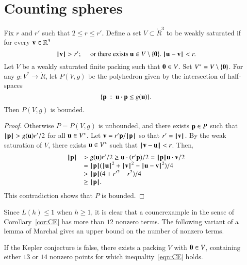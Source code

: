 \section{Counting spheres}

\begin{lemma}\label{lemma:poly-bounded} 
Fix $r$ and $r'$ such that $2\le r\le r'$.
Define a set $ V\subset\ring{R}^3$ to be weakly saturated if for every ${\mathbf v}\in\mathbb{R}^3$
$$
{{\hskip0.1em|\hskip-0.15em|\hskip0.1em}{\mathbf v}{\hskip0.1em|\hskip-0.15em|\hskip0.1em}}> r'; \quad\text{ or there exists }  {\mathbf u}\in V\setminus\{{\mathbf 0}\}.~{\hskip0.1em|\hskip-0.15em|\hskip0.1em} {\mathbf u} - {\mathbf v}{\hskip0.1em|\hskip-0.15em|\hskip0.1em}< r.
$$
Let $ V$ be a weakly saturated finite packing such that ${\mathbf 0}\in  V$.
Set $ V^*= V\setminus\{{\mathbf 0}\}$.
%
For any $g: V^*\to\ring{R}$, let $P( V,g)$ be the
polyhedron given by the intersection of half-spaces
$$
\{{\mathbf p} \ :\   {\mathbf u}\cdot {\mathbf p} \le g( {\mathbf u})\}.
$$
Then $P( V,g)$ is bounded.
\end{lemma}
%

\begin{proof}  Otherwise $P=P( V,g)$ is unbounded, and there exists ${\mathbf p}\in P$ such that
${{\hskip0.1em|\hskip-0.15em|\hskip0.1em}{\mathbf p}{\hskip0.1em|\hskip-0.15em|\hskip0.1em}} > g( {\mathbf u}) r'/2$ for all $ {\mathbf u}\in V^*$.  Let ${\mathbf v} =  r' {\mathbf p}/{{\hskip0.1em|\hskip-0.15em|\hskip0.1em}{\mathbf p}{\hskip0.1em|\hskip-0.15em|\hskip0.1em}}$ so that $r'={{\hskip0.1em|\hskip-0.15em|\hskip0.1em}{\mathbf v}{\hskip0.1em|\hskip-0.15em|\hskip0.1em}}$.  By the weak saturation of $ V$, there exists $ {\mathbf u}\in V^*$ such that ${\hskip0.1em|\hskip-0.15em|\hskip0.1em}{\mathbf v} -  {\mathbf u}{\hskip0.1em|\hskip-0.15em|\hskip0.1em}<r$.    Then,
$$
\begin{array}{lll}
\normo{\p} &> g( \u) r'/2 \ge  \u\cdot (r' \p)/2 = \normo{\p}  \u\cdot \v /2\\
  &= \normo{\p} (\normo{ \u}^2 + \normo{\v}^2 - \norm{ \u}{\v}^2)/4\\
  &> \normo{\p}(4+r'^2-r^2)/4\\
  &\ge \normo{\p}.
\end{array}
$$
This contradiction shows that $P$ is bounded.
\end{proof}




Since $L(h)\le 1$ when $h\ge1$, it is clear that a counerexample in the sense of Corollary~\ref{cor:CE} has more than $12$ nonzero terms.  The following variant of a lemma of Marchal gives an upper bound on the number of nonzero terms.


\begin{lemma}\label{lemma:13-14}  
If the Kepler conjecture is false, there exists a packing $ V$ with ${\mathbf 0}\in V$, containing either $13$ or $14$ nonzero points for which inequality~\ref{eqn:CE} holds.
\end{lemma}


